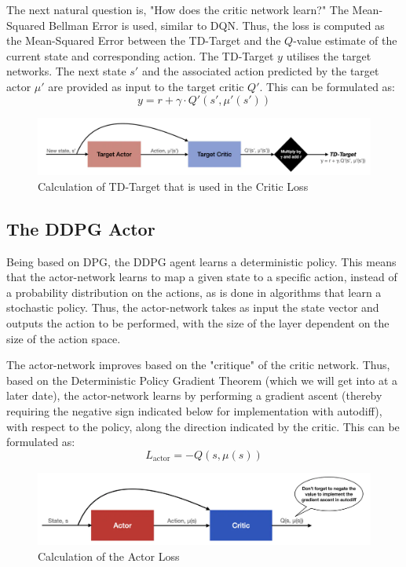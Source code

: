 The next natural question is, "How does the critic network learn?" The Mean-Squared 
Bellman Error is used, similar to DQN. Thus, the loss is computed as the Mean-Squared 
Error between the TD-Target and the $Q$-value estimate of the current state and 
corresponding action. The TD-Target $y$ utilises the target networks. The next state 
$s'$ and the associated action predicted by the target actor $\mu'$ are provided as 
input to the target critic $Q'$. This can be formulated as:
$$
y = r + \gamma \cdot Q'(s', \mu'(s'))
$$

\begin{figure}[H]
\centering
\includegraphics[scale=0.5]{pix/td3/ddpg_critic_loss.png}
\caption{Calculation of TD-Target that is used in the Critic Loss}
\end{figure}


\subsection{The DDPG Actor}

Being based on DPG, the DDPG agent learns a deterministic policy. This means that 
the actor-network learns to map a given state to a specific action, instead of a 
probability distribution on the actions, as is done in algorithms that learn a 
stochastic policy. Thus, the actor-network takes as input the state vector and 
outputs the action to be performed, with the size of the layer dependent on the 
size of the action space.

The actor-network improves based on the "critique" of the critic network. Thus, 
based on the Deterministic Policy Gradient Theorem (which we will get into at a 
later date), the actor-network learns by performing a gradient ascent (thereby 
requiring the negative sign indicated below for implementation with autodiff), 
with respect to the policy, along the direction indicated by the critic. This 
can be formulated as:
$$
L_{\text{actor}} = - Q(s, \mu(s))
$$

\begin{figure}[H]
\centering
\includegraphics[scale=0.5]{pix/td3/ddpg_actor_loss.png}
\caption{Calculation of the Actor Loss}
\end{figure}


